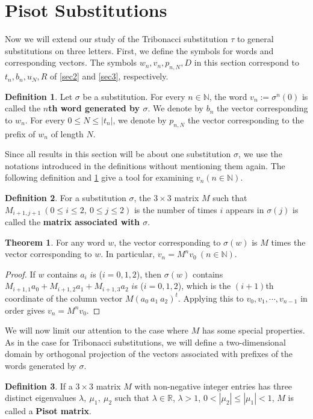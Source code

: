 \documentclass{article}
\theoremstyle{definition}
\newtheorem{theorem}{Theorem}
\newtheorem*{definition}{Definition}
\begin{document}
\section{Pisot Substitutions}
\label{sec4}
Now we will extend our study of the Tribonacci substitution $\tau$ to general substitutions on three letters. First, we define the symbols for words and corresponding vectors. The symbols $w_n, v_n,  p_{n,N}, D$ in this section correspond to $t_n, b_n, u_N,R$ of \cref{sec2} and \cref{sec3}, respectively.
\begin{definition}
Let $\sigma$ be a substitution. For every $n\in \mathbb{N}$, the word $v_n:=\sigma^n(0)$ is called the \textbf{$n$th word generated by $\sigma$}. We denote by $b_n$ the vector corresponding to $w_n$. For every $0\leq N\leq |t_n|$, we denote by $p_{n,N}$ the vector corresponding to the prefix of $w_n$ of length $N$.
\end{definition}
Since all results in this section will be about one substitution $\sigma$, we use the notations introduced in the definitions without mentioning them again. The following definition and \cref{p1} give a tool for examining $v_n(n\in\mathbb{N})$.
\begin{definition}
For a substitution $\sigma$, the $3\times3$ matrix $M$ such that $M_{i+1, j+1}\ (0\leq i\leq 2,\ 0\leq j\leq 2)$ is the number of times $i$ appears in $\sigma(j)$ is called the \textbf{matrix associated with $\sigma$}.
\end{definition}
\begin{theorem}
\label{p1}
For any word $w$, the vector corresponding to $\sigma(w)$ is $M$ times the vector corresponding to $w$. In particular, $v_n=M^nv_0\ (n\in \mathbb{N})$.
\end{theorem}

\begin{proof}
If $w$ contains $a_i$ $i$s ($i=0, 1,2$), then $\sigma(w)$ contains $M_{i+1,1}a_0+M_{i+1,2}a_1+M_{i+1,3}a_2$ $i$s ($i=0, 1,2$), which is the $(i+1)$th coordinate of the column vector $M(a_0\ a_1\ a_2)^t$. Applying this to $v_0, v_1, \cdots, v_{n-1}$ in order gives $v_n=M^nv_0$.
\end{proof}

We will now limit our attention to the case where $M$ has some special properties. As in the case for Tribonacci substitutions, we will define a two-dimensional domain by orthogonal projection of the vectors associated with prefixes of the words generated by $\sigma$.

\begin{definition}
If a $3\times3$ matrix $M$ with non-negative integer entries has three distinct eigenvalues $\lambda,\ \mu_1, \ \mu_2$ such that $\lambda\in\mathbb{R}$, $\lambda>1$, $0<|\mu_2|\leq|\mu_1|<1$, $M$ is called a \textbf{Pisot matrix}.
\end{definition}
\end{document}

